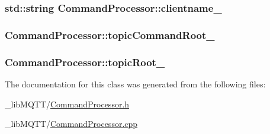 \subsubsection[{\texorpdfstring{clientname\+\_\+}{clientname_}}]{\setlength{\rightskip}{0pt plus 5cm}std\+::string Command\+Processor\+::clientname\+\_\+\hspace{0.3cm}{\ttfamily [protected]}}\hypertarget{class_command_processor_a3922d658643297c47765181a251b10d3}{}\label{class_command_processor_a3922d658643297c47765181a251b10d3}
\subsubsection[{\texorpdfstring{topic\+Command\+Root\+\_\+}{topicCommandRoot_}}]{ Command\+Processor\+::topic\+Command\+Root\+\_\+\hspace{0.3cm}{\ttfamily [protected]}}\hypertarget{class_command_processor_ac695d4ff50c2dd91b25c8079b22170e4}{}\label{class_command_processor_ac695d4ff50c2dd91b25c8079b22170e4}
\subsubsection[{\texorpdfstring{topic\+Root\+\_\+}{topicRoot_}}]{ Command\+Processor\+::topic\+Root\+\_\+\hspace{0.3cm}{\ttfamily [protected]}}\hypertarget{class_command_processor_a97f0d615c62c8c7e1712522c4577ea53}{}\label{class_command_processor_a97f0d615c62c8c7e1712522c4577ea53}


The documentation for this class was generated from the following files\+:\begin{DoxyCompactItemize}
\item 
\+\_\+lib\+M\+Q\+T\+T/\hyperlink{_command_processor_8h}{Command\+Processor.\+h}\item 
\+\_\+lib\+M\+Q\+T\+T/\hyperlink{_command_processor_8cpp}{Command\+Processor.\+cpp}\end{DoxyCompactItemize}
